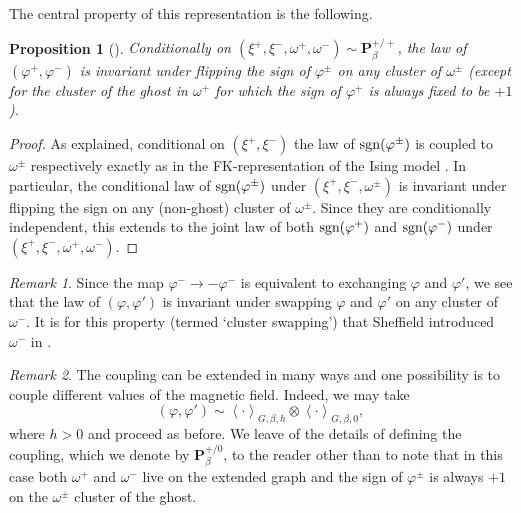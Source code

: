 \documentclass{article}
\newtheorem{proposition}[theorem]{Proposition}
\numberwithin{equation}{section}
\theoremstyle{definition}
\theoremstyle{definition}
\theoremstyle{remark}
\newtheorem{remark}{Remark}
\DeclareMathOperator{\sgn}{\textnormal{sgn}}
\newcommand\vp{\varphi}
\newcommand{\w}{\omega}
\newcommand{\vpp}{\vp^+}
\newcommand{\vpm}{\vp^-}
\renewcommand{\P}{\mathrm{\mathbf{P}}}
\renewcommand{\L}{\xi}
\newcommand{\Lp}{\xi^+}
\newcommand{\Lm}{\xi^-}
\begin{document}
The central property of this representation is the following.
\begin{proposition}[]\label{prop:signflip}
	Conditionally on $(\L^+,\L^-,\w^+,\w^-) \sim \P_{\beta}^{+ / +}$, the law of $(\vp^+,\vp^-)$ is invariant under flipping the sign of $\vp^\pm$ on any cluster of $\w^\pm$ (except for the cluster of the ghost in $\w^+$ for which the sign of $\vp^+$ is always fixed to be $+1$).
\end{proposition}
\begin{proof}
	As explained, conditional on $(\Lp,\Lm)$ the law of $\sgn(\vp^\pm)$ is coupled to $\w^\pm$ respectively exactly as in the FK-representation of the Ising model \cite{FK}. In particular, the conditional law of $\sgn(\vp^\pm)$ under $(\Lp,\Lm,\w^\pm)$ is invariant under flipping the sign on any (non-ghost) cluster of $\w^\pm$. Since they are conditionally independent, this extends to the joint law of both $\sgn(\vpp)$ and $\sgn(\vpm)$ under $(\Lp,\Lm,\w^+,\w^-)$. 
\end{proof}

\begin{remark}
	Since the map $\vp^- \to -\vp^-$ is equivalent to exchanging $\vp$ and $\vp'$, we see that the law of $(\vp,\vp')$ is invariant under swapping $\vp$ and $\vp'$ on any cluster of $\w^-$. It is for this property (termed `cluster swapping') that Sheffield introduced $\w^-$ in \cite{She}.
\end{remark}

\noindent 
 \begin{remark}\label{remark:extensions}
	The coupling can be extended in many ways and one possibility is to couple different values of the magnetic field. Indeed, we may take
		\[
					(\vp , \vp') \sim \left< \cdot \right>_{G,\beta,h} \otimes \left< \cdot \right>_{G,\beta,0},
		\]
		where $h>0$ and proceed as before. We leave of the details of defining the coupling, which we denote by $\P^{+ / 0}_\beta$, to the reader other than to note that in this case both $\w^+$ and $\w^-$ live on the extended graph and the sign of $\vp^\pm$ is always $+1$ on the $\w^\pm$ cluster of the ghost.
\end{remark}
\end{document}
